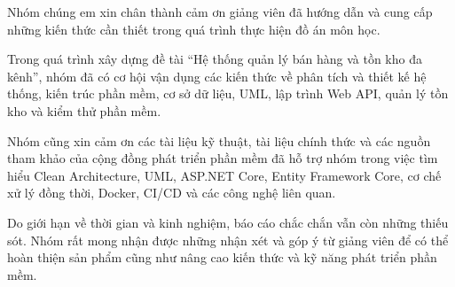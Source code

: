 
Nhóm chúng em xin chân thành cảm ơn giảng viên đã hướng dẫn và cung cấp những kiến thức cần thiết trong quá trình thực hiện đồ án môn học.

Trong quá trình xây dựng đề tài ``Hệ thống quản lý bán hàng và tồn kho đa kênh'', nhóm đã có cơ hội vận dụng các kiến thức về phân tích và thiết kế hệ thống, kiến trúc phần mềm, cơ sở dữ liệu, UML, lập trình Web API, quản lý tồn kho và kiểm thử phần mềm.

Nhóm cũng xin cảm ơn các tài liệu kỹ thuật, tài liệu chính thức và các nguồn tham khảo của cộng đồng phát triển phần mềm đã hỗ trợ nhóm trong việc tìm hiểu Clean Architecture, UML, ASP.NET Core, Entity Framework Core, cơ chế xử lý đồng thời, Docker, CI/CD và các công nghệ liên quan.

Do giới hạn về thời gian và kinh nghiệm, báo cáo chắc chắn vẫn còn những thiếu sót. Nhóm rất mong nhận được những nhận xét và góp ý từ giảng viên để có thể hoàn thiện sản phẩm cũng như nâng cao kiến thức và kỹ năng phát triển phần mềm.
